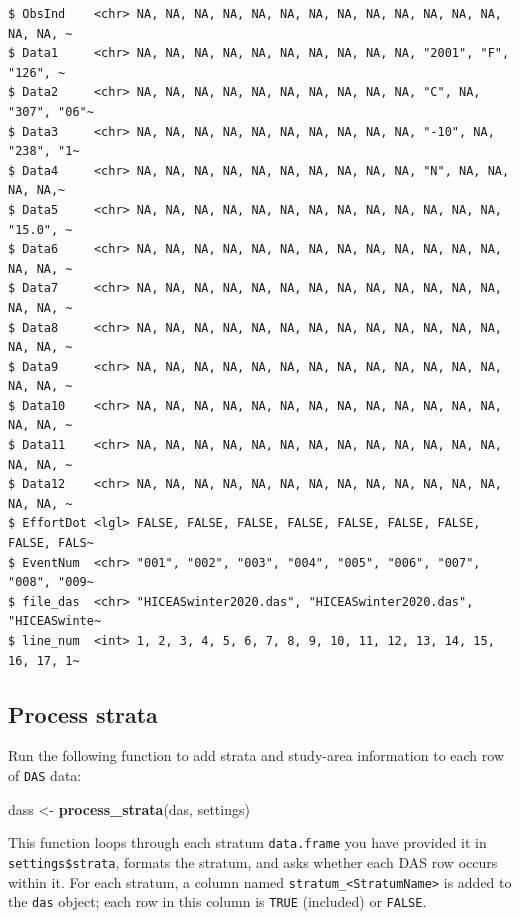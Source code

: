 \documentclass[
]{book}
\newenvironment{Shaded}{\begin{snugshade}}{\end{snugshade}}
\newcommand{\KeywordTok}[1]{\textcolor[rgb]{0.13,0.29,0.53}{\textbf{#1}}}
\newcommand{\NormalTok}[1]{#1}
\newcommand{\StringTok}[1]{\textcolor[rgb]{0.31,0.60,0.02}{#1}}
\begin{document}
\begin{verbatim}
$ ObsInd    <chr> NA, NA, NA, NA, NA, NA, NA, NA, NA, NA, NA, NA, NA, NA, NA, ~
$ Data1     <chr> NA, NA, NA, NA, NA, NA, NA, NA, NA, NA, "2001", "F", "126", ~
$ Data2     <chr> NA, NA, NA, NA, NA, NA, NA, NA, NA, NA, "C", NA, "307", "06"~
$ Data3     <chr> NA, NA, NA, NA, NA, NA, NA, NA, NA, NA, "-10", NA, "238", "1~
$ Data4     <chr> NA, NA, NA, NA, NA, NA, NA, NA, NA, NA, "N", NA, NA, NA, NA,~
$ Data5     <chr> NA, NA, NA, NA, NA, NA, NA, NA, NA, NA, NA, NA, NA, "15.0", ~
$ Data6     <chr> NA, NA, NA, NA, NA, NA, NA, NA, NA, NA, NA, NA, NA, NA, NA, ~
$ Data7     <chr> NA, NA, NA, NA, NA, NA, NA, NA, NA, NA, NA, NA, NA, NA, NA, ~
$ Data8     <chr> NA, NA, NA, NA, NA, NA, NA, NA, NA, NA, NA, NA, NA, NA, NA, ~
$ Data9     <chr> NA, NA, NA, NA, NA, NA, NA, NA, NA, NA, NA, NA, NA, NA, NA, ~
$ Data10    <chr> NA, NA, NA, NA, NA, NA, NA, NA, NA, NA, NA, NA, NA, NA, NA, ~
$ Data11    <chr> NA, NA, NA, NA, NA, NA, NA, NA, NA, NA, NA, NA, NA, NA, NA, ~
$ Data12    <chr> NA, NA, NA, NA, NA, NA, NA, NA, NA, NA, NA, NA, NA, NA, NA, ~
$ EffortDot <lgl> FALSE, FALSE, FALSE, FALSE, FALSE, FALSE, FALSE, FALSE, FALS~
$ EventNum  <chr> "001", "002", "003", "004", "005", "006", "007", "008", "009~
$ file_das  <chr> "HICEASwinter2020.das", "HICEASwinter2020.das", "HICEASwinte~
$ line_num  <int> 1, 2, 3, 4, 5, 6, 7, 8, 9, 10, 11, 12, 13, 14, 15, 16, 17, 1~
\end{verbatim}

\hypertarget{process-strata}{%
\subsection*{Process strata}\label{process-strata}}

Run the following function to add strata and study-area information to each row of \texttt{DAS} data:

\begin{Shaded}
\begin{Highlighting}[]
\NormalTok{dass <-}\StringTok{ }\KeywordTok{process_strata}\NormalTok{(das, settings)}
\end{Highlighting}
\end{Shaded}

This function loops through each stratum \texttt{data.frame} you have provided it in \texttt{settings\$strata}, formats the stratum, and asks whether each DAS row occurs within it. For each stratum, a column named \texttt{stratum\_\textless{}StratumName\textgreater{}} is added to the \texttt{das} object; each row in this column is \texttt{TRUE} (included) or \texttt{FALSE}.
\end{document}
